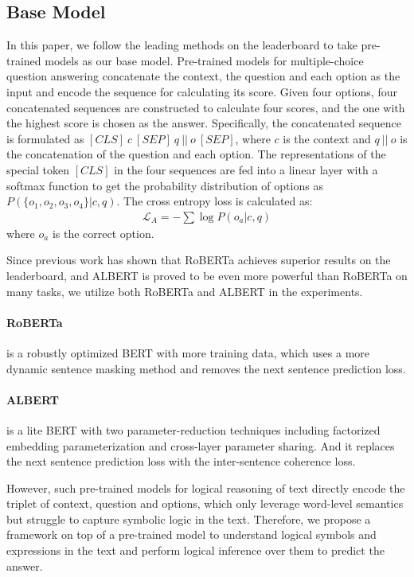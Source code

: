 \documentclass[11pt,a4paper]{article}
\begin{document}
\subsection{Base Model}
\label{section_base_model}
In this paper, we follow the leading methods on the leaderboard to take pre-trained models as our base model.
Pre-trained models for multiple-choice question answering concatenate the context, the question and each option as the input and encode the sequence for calculating its score. Given four options, four concatenated sequences are constructed to calculate four scores, and the one with the highest score is chosen as the answer. 
Specifically, the concatenated sequence is formulated as $[CLS] \ c \ [SEP] \ q \ || \ o \ [SEP]$, where $c$ is the context and $q \ || \ o$ is the concatenation of the question and each option.
The representations of the special token $[CLS]$ in the four sequences are fed into a linear layer with a softmax function to get the probability distribution of options as $P(\{o_1,o_2,o_3,o_4\}|c,q)$. 
The cross entropy loss is calculated as:
\begin{align}
    \mathcal{L}_A = - \sum \mathop{\log}P(o_a|c,q) 
    \label{loss_1}
\end{align}
where $o_a$ is the correct option.

Since previous work \cite{yu2020reclor} has shown that RoBERTa \cite{liu2019roberta} achieves superior results on the leaderboard, and ALBERT \cite{lan2019albert} is proved to be even more powerful than RoBERTa on many tasks, we utilize both RoBERTa and ALBERT in the experiments.
\paragraph{RoBERTa} is a robustly optimized BERT \cite{devlin2019bert} with more training data, which uses a more dynamic sentence masking method and removes the next sentence prediction loss.
\paragraph{ALBERT} is a lite BERT with two parameter-reduction techniques including factorized embedding parameterization and cross-layer parameter sharing. And it replaces the next sentence prediction loss with the inter-sentence coherence loss. 

However, such pre-trained models for logical reasoning of text directly encode the triplet of context, question and options, which only leverage word-level semantics but struggle to capture symbolic logic in the text.
Therefore, we propose a framework on top of a pre-trained model to understand logical symbols and expressions in the text and perform logical inference over them to predict the answer.
\end{document}
